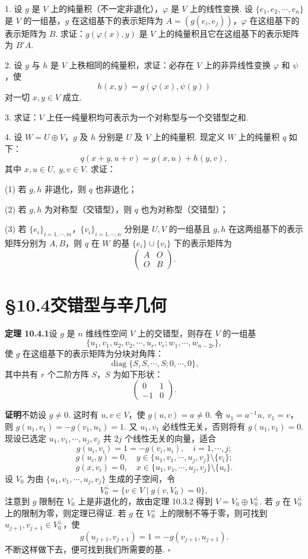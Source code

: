 \documentclass[UTF8,12pt,a4paper,fontset=fandol]{ctexart}
\begin{document}
1. 设 $g$ 是 $V$ 上的纯量积（不一定非退化），$\varphi$ 是 $V$ 上的线性变换. 设 $\{e_1,e_2,\cdots,e_n\}$ 是 $V$ 的一组基，$g$ 在这组基下的表示矩阵为 $A=(g(e_i,e_j))$，$\varphi$ 在这组基下的表示矩阵为 $B$. 求证：$g(\varphi(x),y)$ 是 $V$ 上的纯量积且它在这组基下的表示矩阵为 $B'A$.

2. 设 $g$ 与 $h$ 是 $V$ 上秩相同的纯量积，求证：必存在 $V$ 上的非异线性变换 $\varphi$ 和 $\psi$，使
\[
  h(x,y)=g(\varphi(x),\psi(y))
\]
对一切 $x,y\in V$ 成立.

3. 求证：$V$ 上任一纯量积均可表示为一个对称型与一个交错型之和.

4. 设 $W=U\oplus V$，$g$ 及 $h$ 分别是 $U$ 及 $V$ 上的纯量积. 现定义 $W$ 上的纯量积 $q$ 如下：
\[
  q(x+y,u+v)=g(x,u)+h(y,v),
\]
其中 $x,u\in U,\ y,v\in V$. 求证：

(1) 若 $g,h$ 非退化，则 $q$ 也非退化；

(2) 若 $g,h$ 为对称型（交错型），则 $q$ 也为对称型（交错型）；

(3) 若 $\{e_i\}_{i=1,\cdots,m}$，$\{v_i\}_{i=1,\cdots,n}$ 分别是 $U,V$ 的一组基且 $g,h$ 在这两组基下的表示矩阵分别为 $A,B$，则 $q$ 在 $W$ 的基 $\{e_i\}\cup\{v_i\}$ 下的表示矩阵为
\[
  \left(\begin{array}{cc}
  A&O\\
  O&B
  \end{array}\right).
\]

\section*{§10.4\quad 交错型与辛几何}

\noindent\textbf{定理 10.4.1}\quad 设 $g$ 是 $n$ 维线性空间 $V$ 上的交错型，则存在 $V$ 的一组基
\[
  \{u_1,v_1,u_2,v_2,\cdots,u_r,v_r;w_1,\cdots,w_{n-2r}\},
\]
使 $g$ 在这组基下的表示矩阵为分块对角阵：
\begin{equation}
  \operatorname{diag}\{S,S,\cdots,S;0,\cdots,0\},
  \tag{10.4.1}
\end{equation}
其中共有 $r$ 个二阶方阵 $S$，$S$ 为如下形状：
\[
  \left(\begin{array}{cc}
  0&1\\
  -1&0
  \end{array}\right).
\]

\noindent\textbf{证明}\quad 不妨设 $g\ne0$. 这时有 $u,v\in V$，使 $g(u,v)=a\ne0$. 令 $u_1=a^{-1}u,\ v_1=v$，则 $g(u_1,v_1)=-g(v_1,u_1)=1$. 又 $u_1,v_1$ 必线性无关，否则将有 $g(u_1,v_1)=0$. 现设已选定 $u_1,v_1,\cdots,u_j,v_j$ 共 $2j$ 个线性无关的向量，适合
\[
  g(u_i,v_i)=1=-g(v_i,u_i),\quad i=1,\cdots,j;
\]
\[
  g(u_i,y)=0,\quad y\in\{u_1,v_1,\cdots,u_j,v_j\}\setminus\{v_i\};
\]
\[
  g(x,v_i)=0,\quad x\in\{u_1,v_1,\cdots,u_j,v_j\}\setminus\{u_i\}.
\]
设 $V_0$ 为由 $\{u_1,v_1,\cdots,u_j,v_j\}$ 生成的子空间，令
\[
  V_0^\perp=\{v\in V\mid g(v,V_0)=0\},
\]
注意到 $g$ 限制在 $V_0$ 上是非退化的，故由定理 10.3.2 得到 $V=V_0\oplus V_0^\perp$. 若 $g$ 在 $V_0^\perp$ 上的限制为零，则定理已得证. 若 $g$ 在 $V_0^\perp$ 上的限制不等于零，则可找到 $u_{j+1},v_{j+1}\in V_0^\perp$，使
\[
  g(u_{j+1},v_{j+1})=1=-g(v_{j+1},u_{j+1}).
\]
不断这样做下去，便可找到我们所需要的基. $\square$
\end{document}
